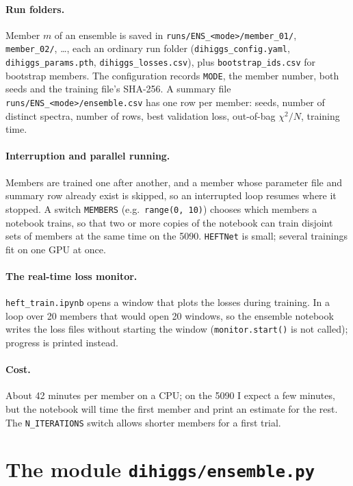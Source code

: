 \documentclass[11pt]{article}
\newcommand{\file}[1]{\nolinkurl{#1}}
\newcommand{\code}[1]{\texttt{#1}}
\begin{document}
\paragraph{Run folders.} Member $m$ of an ensemble is saved in
\file{runs/ENS_<mode>/member_01/}, \file{member_02/}, \ldots, each an ordinary run folder
(\file{dihiggs_config.yaml}, \file{dihiggs_params.pth}, \file{dihiggs_losses.csv}), plus
\file{bootstrap_ids.csv} for bootstrap members. The configuration records \code{MODE},
the member number, both seeds and the training file's SHA-256. A summary file
\file{runs/ENS_<mode>/ensemble.csv} has one row per member: seeds, number of distinct
spectra, number of rows, best validation loss, out-of-bag $\chi^2/N$, training time.

\paragraph{Interruption and parallel running.} Members are trained one after another, and
a member whose parameter file and summary row already exist is skipped, so an interrupted
loop resumes where it stopped. A switch \code{MEMBERS} (e.g.\ \code{range(0, 10)}) chooses
which members a notebook trains, so that two or more copies of the notebook can train
disjoint sets of members at the same time on the 5090. \code{HEFTNet} is small; several
trainings fit on one GPU at once.

\paragraph{The real-time loss monitor.} \file{heft_train.ipynb} opens a window that plots
the losses during training. In a loop over 20 members that would open 20 windows, so the
ensemble notebook writes the loss files without starting the window
(\code{monitor.start()} is not called); progress is printed instead.

\paragraph{Cost.} About 42 minutes per member on a CPU; on the 5090 I expect a few
minutes, but the notebook will time the first member and print an estimate for the rest.
The \code{N\_ITERATIONS} switch allows shorter members for a first trial.

\section{The module \texttt{dihiggs/ensemble.py}}
\label{sec:module}
\end{document}
